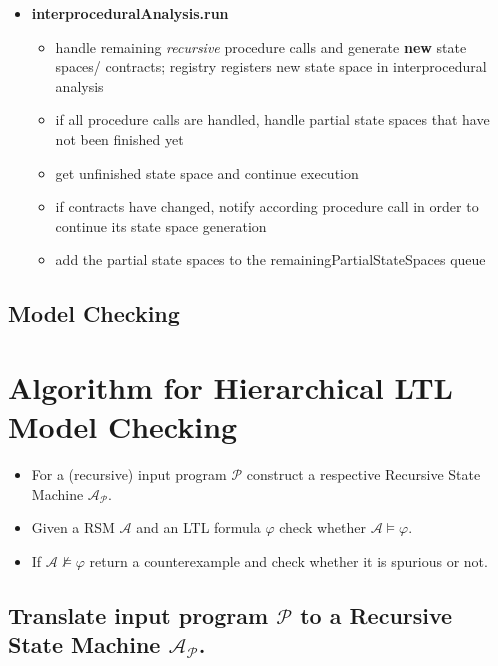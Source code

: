 \documentclass[a4paper,12pt]{article}
\begin{document}
\begin{itemize}
\begin{itemize}
	\end{itemize}
	\item \textbf{interproceduralAnalysis.run}
	\begin{itemize}
		\item handle remaining \textit{recursive} procedure calls and generate \textbf{new} state spaces/ contracts; registry registers new state space in interprocedural analysis
		\item if all procedure calls are handled, handle partial state spaces that have not been finished yet
		\item get unfinished state space and continue execution
		\item if contracts have changed, notify according procedure call in order to continue its state space generation 
		\item add the partial state spaces to the remainingPartialStateSpaces queue
	\end{itemize}
\end{itemize}

\subsection{Model Checking}


\section{Algorithm for Hierarchical LTL Model Checking}

\begin{itemize}
	\item For a (recursive) input program $\mathcal{P}$ construct a respective Recursive State Machine $\mathcal{A}_{\mathcal{P}}$. 
	\item Given a RSM $\mathcal{A}$ and an LTL formula $\varphi$ check whether $\mathcal{A} \models \varphi$. 
	\item If $\mathcal{A} \nvDash \varphi$ return a counterexample and check whether it is spurious or not.
\end{itemize}

\subsection{Translate input program $\mathcal{P}$ to a Recursive State Machine $\mathcal{A}_{\mathcal{P}}$.}
\end{document}
